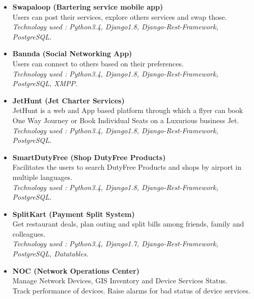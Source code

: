 \documentclass[11pt]{article}
\begin{document}
\begin{itemize}
 \item \textbf{Swapaloop (Bartering service mobile app)}
    \\ Users can post their services, explore others services and swap those.
    \\ \textit{Technology used : Python3.4, Django1.8, Django-Rest-Framework, PostgreSQL.}
 \item \textbf{Bannda (Social Networking App)}
    \\ Users can connect to others based on their preferences.
    \\ \textit{Technology used : Python3.4, Django1.8, Django-Rest-Framework, PostgreSQL, XMPP.}
 \item \textbf{JetHunt (Jet Charter Services)}
    \\ JetHunt is a web and App based platform through which a flyer can book One Way Journey or Book Individual Seats on a Luxurious business Jet.
    \\ \textit{Technology used : Python3.4, Django1.8, Django-Rest-Framework, PostgreSQL.}
 \item \textbf{SmartDutyFree (Shop DutyFree Products)}
    \\ Facilitates the users to search DutyFree Products and shops by airport in multiple languages.
    \\ \textit{Technology used : Python3.4, Django1.8, Django-Rest-Framework, PostgreSQL.}
 \item \textbf{SplitKart (Payment Split System)}
    \\ Get restaurant deals, plan outing and split bills among friends, family and colleagues.
    \\ \textit{Technology used : Python3.4, Django1.7, Django-Rest-Framework, PostgreSQL, Datatables.}
 \item \textbf{NOC (Network Operations Center)}
    \\ Manage Network Devices, GIS Inventory and Device Services Status.
    \\ Track performance of devices. Raise alarms for bad status of device services.

\end{itemize}
\end{document}
